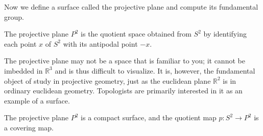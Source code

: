 Now we define a surface called the projective plane and compute its fundamental group.

\begin{definition}
The projective plane \( P^{2}\) is the quotient space obtained from \(S^{2}\) by identifying each point \(x\) of \(S^{2}\) with its antipodal point \(- x\).
\end{definition}

The projective plane may not be a space that is familiar to you; it cannot be imbedded in \(\mathbb{R}^{3}\) and is thus difficult to visualize. It is, however, the fundamental object of study in projective geometry, just as the euclidean plane \(\mathbb{R}^{2}\) is in ordinary euclidean geometry. Topologists are primarily interested in it as an example of a surface.

\begin{theorem}
\label{thm:\thetheorem}
The projective plane \(P^{2}\) is a compact surface, and the quotient map \(p : S^{2} \rightarrow {P}^{2}\) is a covering map.
\end{theorem}

